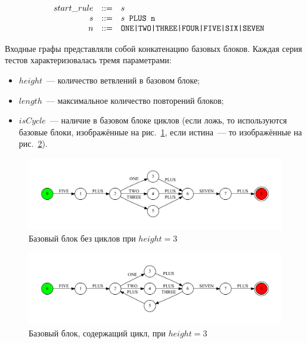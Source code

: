 $$
\begin{array}{crcl}
& start\_rule &::=& s \\
& s & ::= & s \mbox{\texttt{ PLUS }} \mbox{\texttt{n}}\\
& n & ::= & \mbox{\texttt{ONE|TWO|THREE|FOUR|FIVE|SIX|SEVEN}}
\end{array}
$$

Входные графы представляли собой конкатенацию базовых блоков. Каждая серия тестов характеризовалась тремя параметрами: 
\begin{itemize}
  \item $height$~--- количество ветвлений в базовом блоке;
  \item $length$~--- максимальное количество повторений блоков;
  \item $isCycle$~--- наличие в базовом блоке циклов (если ложь, то используются базовые блоки, изображённые на рис.~\ref{block}, если истина~--- то изображённые на рис.~\ref{block_loop}).
\end{itemize}
\begin{figure}[H]
 \centering
 \includegraphics[width=\textwidth]{Verbitskaya/pics/block.pdf}
 \caption{Базовый блок без циклов при $height=3$}
 \label{block}
\end{figure}
\begin{figure}[H]
 \centering
 \includegraphics[width=\textwidth]{Verbitskaya/pics/block_loop.pdf}
 \caption{Базовый блок, содержащий цикл, при $height=3$}
 \label{block_loop}
\end{figure}

